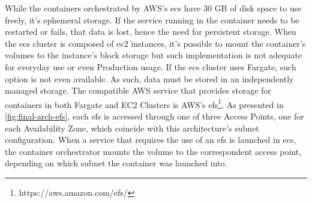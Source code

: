While the containers orchestrated by AWS's \gls{ecs} have 30 GB of disk space to use freely, it's ephemeral storage. If the service running in the container needs to be restarted or fails, that data is lost, hence the need for persistent storage. 
When the \gls{ecs} cluster is composed of \gls{ec2} instances, it's possible to mount the container's volumes to the instance's block storage but such implementation is not adequate for everyday use or even Production usage. If the \gls{ecs} cluster uses Fargate, such option is not even available. As such, data must be stored in an independently managed storage. The compatible AWS service that provides storage for containers in both Fargate and EC2 Clusters is AWS's \gls{efs}\footnote{https://aws.amazon.com/efs/\label{foot:efs}}.
As presented in \cref{fig:final-arch-efs}, each \gls{efs} is accessed through one of three Access Points, one for each Availability Zone, which coincide with this architecture's subnet configuration.
When a service that requires the use of an \gls{efs} is launched in \gls{ecs}, the container orchestrator mounts the volume to the correspondent access point, depending on which subnet the container was launched into.